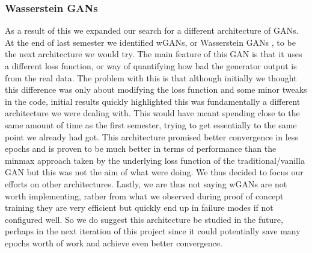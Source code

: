 \documentclass[11pt]{article} %
\begin{document}
\subsubsection{Wasserstein GANs}
As a result of this we expanded our search for a different architecture of GANs.
At the end of last semester we identified wGANs, or Wasserstein GANs \cite{arjovsky2017wasserstein}, to be the next architecture we would try.
The main feature of this GAN is that it uses a different loss function, or way of quantifying how bad the generator output is from the real data.
The problem with this is that although initially we thought this difference was only about modifying the loss function and some minor tweaks in the code,
initial results quickly highlighted this was fundamentally a different architecture we were dealing with.
This would have meant spending close to the same amount of time as the first semester, trying to get essentially to the same point we already had got.
This architecture promised better convergence in less epochs and is proven to be much better in terms of performance than the minmax approach taken by the
underlying loss function of the traditional/vanilla GAN but this was not the aim of what were doing.
We thus decided to focus our efforts on other architectures.
Lastly, we are thus not saying wGANs are not worth implementing, rather from what we observed during
proof of concept training they are very efficient but quickly end up in failure modes if not configured well.
So we do suggest this architecture be studied in the future, perhaps in the next iteration of this project since it could potentially
save many epochs worth of work and achieve even better convergence.
\end{document}

